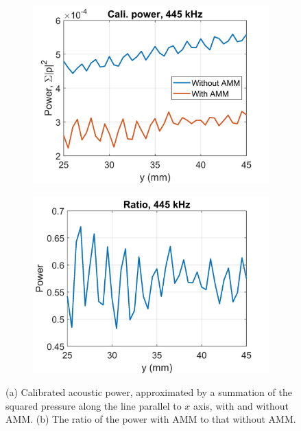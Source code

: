 \documentclass{article}
\begin{document}
\begin{figure}[!htb]
    \centering
    \begin{subfigure}{0.45\textwidth}
        \centering
        \includegraphics[width = \textwidth]{../../matlab/exp/fig/AnalyzeData_230227D_Exp230223B_Exp230227B_CaliPow}
        \caption{}
    \end{subfigure}
    \begin{subfigure}{0.45\textwidth}
        \centering
        \includegraphics[width = \textwidth]{../../matlab/exp/fig/AnalyzeData_230227D_Exp230223B_Exp230227B_CaliPowRatio}
        \caption{}
    \end{subfigure}
    \caption{(a) Calibrated acoustic power, approximated by a summation of the squared pressure along the line parallel to $x$ axis, with and without AMM. 
    (b) The ratio of the power with AMM to that without AMM.}
    \label{fig:f9e:320eui203}
\end{figure}
\end{document}
